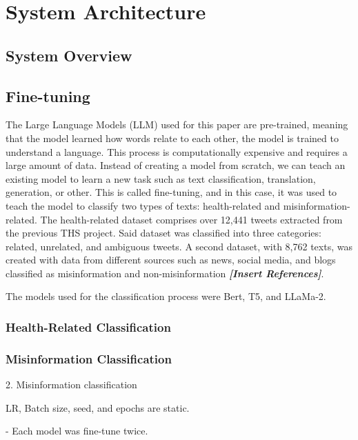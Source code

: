 
\chapter{System Architecture}  

\section{System Overview}

\section{Fine-tuning}

The Large Language Models (LLM) used for this paper are pre-trained, meaning that the model learned how words relate to each other, the model is trained to understand a language. This process is computationally expensive and requires a large amount of data. Instead of creating a model from scratch, we can teach an existing model to learn a new task such as text classification, translation, generation, or other. This is called fine-tuning, and in this case, it was used to teach the model to classify two types of texts: health-related and misinformation-related. 
\newline
\newline
The health-related dataset comprises over 12,441 tweets extracted from the previous THS project. Said dataset was classified into three categories: related, unrelated, and ambiguous tweets. A second dataset, with 8,762 texts, was created with data from different sources such as news, social media, and blogs classified as misinformation and non-misinformation \textbf{\textit{[Insert References]}}. 

The models used for the classification process were Bert, T5, and LLaMa-2. 

\subsection{Health-Related Classification}


\subsection{Misinformation Classification}


2. Misinformation classification

LR, Batch size, seed, and epochs are static.

- Each model was fine-tune twice.

